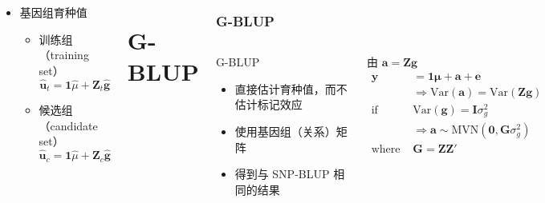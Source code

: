 \documentclass[serif,aspectratio=169]{beamer}
\begin{document}
\begin{frame}
\begin{columns}
\begin{frame}
\begin{columns}
    \pause
    \begin{column}{.4\textwidth}
      \begin{itemize}
      \item 基因组育种值
        \begin{itemize}
        \item 训练组（training set）
          $$\hat{\mathbf{u}}_t = \mathbf{1}\hat{\mu}+\mathbf{Z}_t\hat{\mathbf{g}}$$
        \item 候选组（candidate set）
          $$\hat{\mathbf{u}}_c = \mathbf{1}\hat{\mu}+\mathbf{Z}_c\hat{\mathbf{g}}$$
        \end{itemize}
      \end{itemize}
    \end{column}
  \end{columns}
\end{frame}


\section{G-BLUP}
\begin{frame}
  \frametitle{G-BLUP}
  \begin{columns}
    \begin{column}{.5\textwidth}
      \begin{block}{G-BLUP}
        \begin{itemize}
        \item 直接估计育种值，而不估计标记效应
        \item 使用基因组（关系）矩阵
        \item 得到与 SNP-BLUP 相同的结果
        \end{itemize}
      \end{block}
    \end{column}

    \pause
    \begin{column}{.5\textwidth}
      \begin{block}{由 $\mathbf{a=Zg}$}
        \begin{align*}
          \mathbf{y} &=\mathbf{1\mu+a+e}\\
          &\Rightarrow\mathrm{Var}(\mathbf{a})=\mathrm{Var}(\mathbf{Zg})=\mathbf{Z}\mathrm{Var}(\mathbf{g})\mathbf{Z}'\\
          \textrm{if } & \mathrm{Var}(\mathbf{g}) =\mathbf{I}\sigma_g^2\\
          & \Rightarrow\mathbf{a}\sim\mathrm{MVN}(\mathbf{0,G}\sigma_g^2)\\
          \textrm{where } &\mathbf{G=ZZ}'
        \end{align*}
      \end{block}
    \end{column}
  \end{columns}
\end{frame}



\end{columns}
\end{frame}
\end{document}

